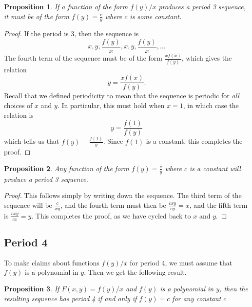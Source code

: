 \documentclass[12pt]{article}
\newtheorem{proposition}{Proposition}
\begin{document}
\begin{proposition}
If a function of the form $f(y)/x$ produces a period 3 sequence, it must be of the form $f(y) = \frac{c}{y}$ where $c$ is some constant.
\end{proposition}

\begin{proof}
If the period is 3, then the sequence is
\begin{equation*}
x, y, \dfrac{f(y)}{x}, x, y, \dfrac{f(y)}{x}, \dots
\end{equation*}
The fourth term of the sequence must be of the form $\frac{x f(x)}{f(y)}$, which gives the relation
\[ y = \frac{x f(x)}{f(y)}. \]
Recall that we defined periodicity to mean that the sequence is periodic for \emph{all} choices of $x$ and $y$. In particular, this must hold when $x = 1$, in which case the relation is
\[ y = \frac{f(1)}{f(y)} \]
which tells us that $f(y) = \frac{f(1)}{y}$. Since $f(1)$ is a constant, this completes the proof.
\end{proof}

\begin{proposition}
Any function of the form $f(y) = \frac{c}{y}$ where $c$ is a constant will produce a period 3 sequence.
\end{proposition}
\begin{proof}
This follows simply by writing down the sequence. The third term of the sequence will be $\frac{c}{xy}$, and the fourth term must then be $\frac{cxy}{cy} = x$, and the fifth term is $\frac{cxy}{cx} = y$. This completes the proof, as we have cycled back to $x$ and $y$.
 \end{proof}

\subsection{Period 4}

To make claims about functions $f(y)/x$ for period 4, we must assume that $f(y)$ is a polynomial in $y$. Then we get the following result.

\begin{proposition}
If $F(x,y) = f(y)/x$ and $f(y)$ is a polynomial in $y$, then the resulting sequence has period 4 if and only if $f(y) = c$ for any constant $c$
\end{proposition}
\end{document}
